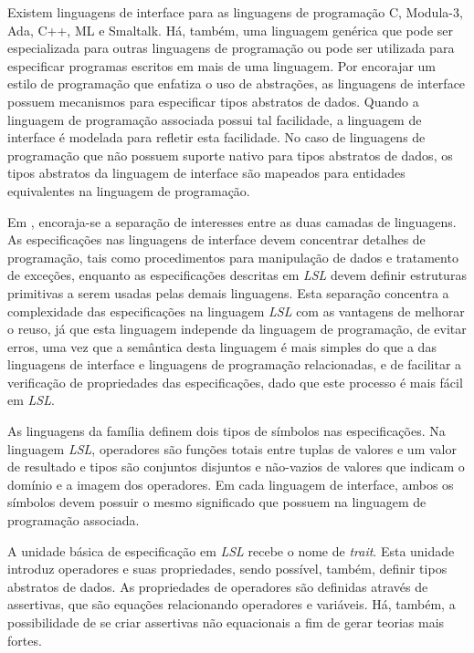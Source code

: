 Existem linguagens de interface para as linguagens de programação C, Modula-3, Ada, C++, ML e Smaltalk.
Há, também, uma linguagem genérica que pode ser especializada para outras linguagens de programação ou pode ser utilizada para especificar programas escritos em mais de uma linguagem.
Por encorajar um estilo de programação que enfatiza o uso de abstrações, as linguagens de interface possuem mecanismos para especificar tipos abstratos de dados.
Quando a linguagem de programação associada possui tal facilidade, a linguagem de interface é modelada para refletir esta facilidade.
No caso de linguagens de programação que não possuem suporte nativo para tipos abstratos de dados, os tipos abstratos da linguagem de interface são mapeados para entidades equivalentes na linguagem de programação.

Em \Larch, encoraja-se a separação de interesses entre as duas camadas de linguagens.
As especificações nas linguagens de interface devem concentrar detalhes de programação, tais como procedimentos para manipulação de dados e tratamento de exceções, enquanto as especificações descritas em \textit{LSL} devem definir estruturas primitivas a serem usadas pelas demais linguagens.
Esta separação concentra a complexidade das especificações na linguagem \textit{LSL} com as vantagens de melhorar o reuso, já que esta linguagem independe da linguagem de programação, de evitar erros, uma vez que a semântica desta linguagem é mais simples do que a das linguagens de interface e linguagens de programação relacionadas, e de facilitar a verificação de propriedades das especificações, dado que este processo é mais fácil em \textit{LSL}.

As linguagens da família \Larch definem dois tipos de símbolos nas especificações.
Na linguagem \textit{LSL}, operadores são funções totais entre tuplas de valores e um valor de resultado e tipos são conjuntos disjuntos e não-vazios de valores que indicam o domínio e a imagem dos operadores.
Em cada linguagem de interface, ambos os símbolos devem possuir o mesmo significado que possuem na linguagem de programação associada.

A unidade básica de especificação em \textit{LSL} recebe o nome de \textit{trait}.
Esta unidade introduz operadores e suas propriedades, sendo possível, também, definir tipos abstratos de dados.
As propriedades de operadores são definidas através de assertivas, que são equações relacionando operadores e variáveis.
Há, também, a possibilidade de se criar assertivas não equacionais a fim de gerar teorias mais fortes.


